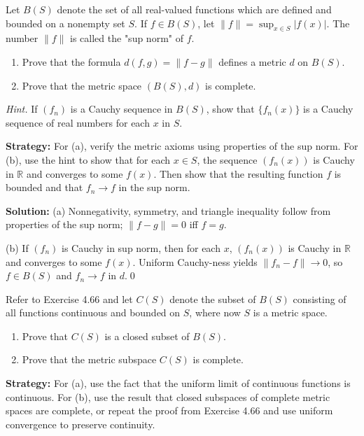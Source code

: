 \begin{problembox}
Let $B(S)$ denote the set of all real-valued functions which are defined and bounded on a nonempty set $S$. If $f \in B(S)$, let $\|f\| = \sup_{x \in S} |f(x)|$. The number $\|f\|$ is called the "sup norm" of $f$.
\begin{enumerate}[label=(\alph*)]
\item Prove that the formula $d(f, g) = \|f - g\|$ defines a metric $d$ on $B(S)$.
\item Prove that the metric space $(B(S), d)$ is complete. 
\end{enumerate}
\textit{Hint.} If $(f_n)$ is a Cauchy sequence in $B(S)$, show that $\{f_n(x)\}$ is a Cauchy sequence of real numbers for each $x$ in $S$.
\end{problembox}

\noindent\textbf{Strategy:} For (a), verify the metric axioms using properties of the sup norm. For (b), use the hint to show that for each $x \in S$, the sequence $(f_n(x))$ is Cauchy in $\mathbb{R}$ and converges to some $f(x)$. Then show that the resulting function $f$ is bounded and that $f_n \to f$ in the sup norm.

\bigskip\noindent\textbf{Solution:}
(a) Nonnegativity, symmetry, and triangle inequality follow from properties of the sup norm; $\|f-g\|=0$ iff $f=g$.

(b) If $(f_n)$ is Cauchy in sup norm, then for each $x$, $(f_n(x))$ is Cauchy in $\mathbb{R}$ and converges to some $f(x)$. Uniform Cauchy-ness yields $\|f_n-f\|\to 0$, so $f\in B(S)$ and $f_n\to f$ in $d$.\qed



\begin{problembox}
Refer to Exercise 4.66 and let $C(S)$ denote the subset of $B(S)$ consisting of all functions continuous and bounded on $S$, where now $S$ is a metric space.
\begin{enumerate}[label=(\alph*)]
\item Prove that $C(S)$ is a closed subset of $B(S)$.
\item Prove that the metric subspace $C(S)$ is complete.
\end{enumerate}
\end{problembox}

\noindent\textbf{Strategy:} For (a), use the fact that the uniform limit of continuous functions is continuous. For (b), use the result that closed subspaces of complete metric spaces are complete, or repeat the proof from Exercise 4.66 and use uniform convergence to preserve continuity.

